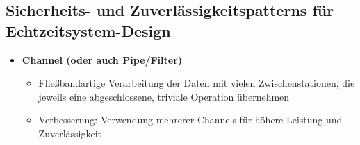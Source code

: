 \subsection{Sicherheits- und Zuverlässigkeitspatterns für Echtzeitsystem-Design}
\begin{itemize}
	\item \textbf{Channel (oder auch Pipe/Filter)}
	\begin{itemize}
		\item Fließbandartige Verarbeitung der Daten mit vielen Zwischenstationen, die jeweils eine abgeschlossene, triviale Operation übernehmen
		\item Verbesserung: Verwendung mehrerer Channels für höhere Leistung und Zuverlässigkeit
	\end{itemize}
\end{itemize}